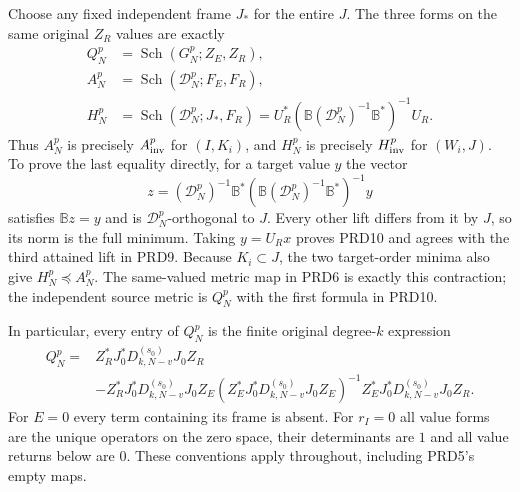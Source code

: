 Choose any fixed independent frame $J_*$ for the entire $J$.
The three forms on the same original $Z_R$ values are exactly
\[
\begin{aligned}
 Q_N^p&=\operatorname{Sch}(G_N^p;Z_E,Z_R),\\
 A_N^p&=\operatorname{Sch}(\mathcal D_N^p;F_E,F_R),\\
 H_N^p&=\operatorname{Sch}(\mathcal D_N^p;J_*,F_R)
      =U_R^*(\mathbb B(\mathcal D_N^p)^{-1}\mathbb B^*)^{-1}U_R.
\end{aligned}                                                    \tag{PRD10}
\]
Thus $A_N^p$ is precisely $A_{\rm inv}^p$ for $(I,K_i)$,
and $H_N^p$ is precisely $H_{\rm inv}^p$ for $(W_i,J)$.
To prove the last equality directly, for a target value $y$ the
vector
\[
 z=(\mathcal D_N^p)^{-1}\mathbb B^*
       (\mathbb B(\mathcal D_N^p)^{-1}\mathbb B^*)^{-1}y
\]
satisfies $\mathbb Bz=y$ and is $\mathcal D_N^p$-orthogonal
to $J$. Every other lift differs from it by $J$, so its norm
is the full minimum. Taking $y=U_Rx$ proves PRD10 and agrees
with the third attained lift in PRD9. Because $K_i\subset J$,
the two target-order minima also give $H_N^p\preceq A_N^p$.
The same-valued metric map in PRD6 is exactly this contraction;
the independent source metric is $Q_N^p$ with the first
formula in PRD10.

In particular, every entry of $Q_N^p$ is the finite original
degree-$k$ expression
\[
\begin{split}
 Q_N^p={}&Z_R^*J_0^*D_{k,N-v}^{(s_0)}J_0Z_R\\
 &-Z_R^*J_0^*D_{k,N-v}^{(s_0)}J_0Z_E
 (Z_E^*J_0^*D_{k,N-v}^{(s_0)}J_0Z_E)^{-1}
 Z_E^*J_0^*D_{k,N-v}^{(s_0)}J_0Z_R .
\end{split}                                                      \tag{PRD11}
\]
For $E=0$ every term containing its frame is absent. For $r_I=0$
all value forms are the unique operators on the zero space,
their determinants are $1$ and all value returns below are $0$.
These conventions apply throughout, including PRD5's empty maps.

